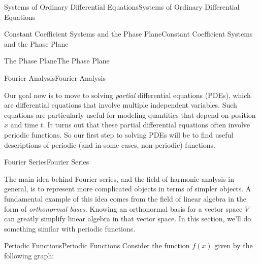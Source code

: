 \documentclass[10pt,]{book}
\numberwithin{equation}{section}
\begin{document}
\begin{chapterptx}{Systems of Ordinary Differential Equations}{}{Systems of Ordinary Differential Equations}{}{}
\begin{sectionptx}{Constant Coefficient Systems and the Phase Plane}{}{Constant Coefficient Systems and the Phase Plane}{}{}
\begin{subsectionptx}{The Phase Plane}{}{The Phase Plane}{}{}
\end{subsectionptx}
\end{sectionptx}
\end{chapterptx}
%
%
\typeout{************************************************}
\typeout{************************************************}
%
\begin{chapterptx}{Fourier Analysis}{}{Fourier Analysis}{}{}\label{fourier-analysis}
\begin{introduction}{}%
\hypertarget{p-375}{}%
Our goal now is to move to solving \emph{partial} differential equations (PDEs), which are differential equations that involve multiple independent variables. Such equations are particularly useful for modeling quantities that depend on position \(x\) and time \(t\). It turns out that these partial differential equations often involve periodic functions. So our first step to solving PDEs will be to find useful descriptions of periodic (and in some cases, non-periodic) functions.%
\end{introduction}%
%
%
\typeout{************************************************}
\typeout{************************************************}
%
\begin{sectionptx}{Fourier Series}{}{Fourier Series}{}{}\label{section-fourier-series}
\begin{introduction}{}%
\hypertarget{p-376}{}%
The main idea behind Fourier series, and the field of harmonic analysis in general, is to represent more complicated objects in terms of simpler objects. A fundamental example of this idea comes from the field of linear algebra in the form of \emph{orthonormal bases}. Knowing an orthonormal basis for a vector space \(V\) can greatly simplify linear algebra in that vector space. In this section, we'll do something similar with periodic functions.%
\end{introduction}%
%
%
\typeout{************************************************}
\typeout{************************************************}
%
\begin{subsectionptx}{Periodic Functions}{}{Periodic Functions}{}{}\label{subsection-periodic-functions}
\hypertarget{p-377}{}%
Consider the function \(f(x)\) given by the following graph:%
\begin{figure}
\centering
{}%

\end{figure}
\end{subsectionptx}
\end{sectionptx}
\end{chapterptx}
\end{document}
